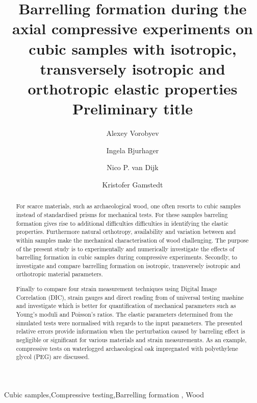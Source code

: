 \documentclass[3p]{elsarticle}
\begin{document}
\doublespacing


\begin{frontmatter}

\title{Barrelling formation during the axial compressive experiments on cubic
samples with  isotropic, transversely isotropic and orthotropic elastic
properties {\color{red} Preliminary title}}







\author{Alexey Vorobyev}


\author{Ingela Bjurhager}
\author{Nico P. van Dijk}
\author{Kristofer Gamstedt}

\address{Uppsala University, Division of Appplied Mechanics,
Uppsala, Sweden }



\begin{abstract}
For scarce materials, such as archaeological wood, one often resorts to cubic
samples instead of standardised prisms for mechanical tests. For these samples
barreling formation gives rise to additional difficulties difficulties in
identifying the elastic properties.
Furthermore natural orthotropy, availability and variation between and within
samples make the mechanical characterisation of wood  challenging. 
The purpose of the present study is to experimentally and numerically investigate the effects of barrelling
formation in cubic samples during compressive experiments. Secondly, to investigate and
compare barrelling formation on isotropic, transversely 
isotropic and orthotropic material parameters. \par
Finally to compare four strain measurement techniques using
Digital Image Correlation (DIC), strain gauges and direct
reading from of universal testing mashine and investigate which is better for
quantification of mechanical parameters such as Young's moduli and Poisson's ratios.
The elastic parameters determined from the simulated tests were normalised with regards to the input parameters. The presented relative errors provide information when the perturbation caused by barreling effect is negligible or significant for various materials and strain measurements. 
As an example, compressive tests on waterlogged archaeological oak impregnated
with polyethylene glycol (PEG) are discussed.


\end{abstract}

\begin{keyword}
Cubic samples\sep Compressive testing\sep Barrelling formation \sep
Wood
\end{keyword}

\end{frontmatter}
\end{document}
